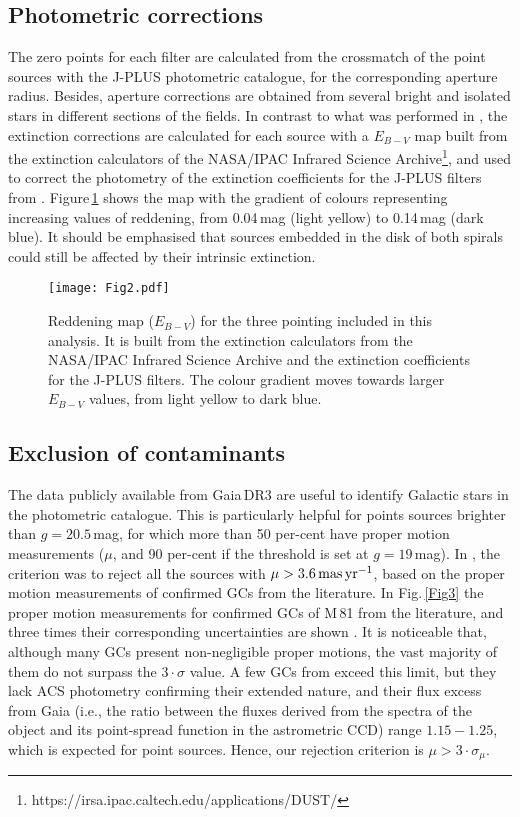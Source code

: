 \documentclass[baaa]{baaa}
\begin{document}
\subsection{Photometric corrections}
  The zero points for each filter are calculated from the crossmatch of the 
  point sources with the J-PLUS photometric catalogue, for the corresponding
  aperture radius. Besides, aperture corrections are obtained from several 
  bright and isolated stars in different sections of the fields. In contrast
  to what was performed in \citet{chi22}, the extinction corrections are 
  calculated for each source with a $E_{B-V}$ map built from the extinction 
  calculators of the NASA/IPAC Infrared Science 
Archive\footnote{https://irsa.ipac.caltech.edu/applications/DUST/},
  and used to correct the photometry of the extinction coefficients 
  for the J-PLUS filters from \citet{lop19}. Figure\,\ref{Fig2} shows
  the map with the gradient of colours representing increasing values of 
  reddening, from 0.04\,mag (light yellow) to 0.14\,mag (dark blue). It 
  should be emphasised that sources embedded in the disk of both spirals 
  could still be affected by their intrinsic extinction.

  \begin{figure}[!t]
  \centering
  \texttt{[image: Fig2.pdf]}
  \caption{Reddening map ($E_{B-V}$) for the three pointing included in
  this analysis. It is built from the extinction calculators from the 
  NASA/IPAC Infrared Science Archive and the extinction coefficients for
  the J-PLUS filters. The colour gradient moves towards larger $E_{B-V}$
  values, from light yellow to dark blue.}
  \label{Fig2}
\end{figure}

\subsection{Exclusion of contaminants}
The data publicly available from Gaia\,DR3 are useful to identify Galactic 
stars in the photometric catalogue. This is particularly helpful for
points sources brighter than $g=20.5$\,mag, for which more than 50 
per-cent have proper motion measurements ($\mu$, and 90 per-cent if the 
threshold is set at $g=19$\,mag). In \citet{chi22}, the criterion was to 
reject all the sources with $\mu > 3.6\,{\rm mas\,yr^{-1}}$, based on 
the proper motion measurements of confirmed GCs from the literature. In 
Fig.\,\ref{Fig3} the proper motion measurements for confirmed GCs of M\,81 
from the literature, and three times their corresponding uncertainties
are shown . It is noticeable that, although many GCs present non-negligible 
proper motions, the vast majority of them do not surpass the 
$3\cdot \sigma$ value. A few GCs from \citet{per95} exceed this limit, 
but they lack ACS photometry confirming their extended nature, and 
their flux excess from Gaia (i.e., the ratio between the fluxes derived from
the spectra of the object and its point-spread function in the astrometric CCD) 
range $1.15-1.25$, which is expected for 
point sources. Hence, our rejection criterion is $\mu > 3\cdot \sigma_{\mu}$.
\end{document}
